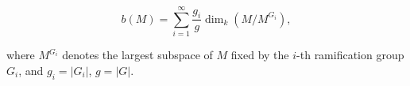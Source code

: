 $$b(M) = \sum_{i=1}^{\infty} \frac{g_i}{g} \dim_k(M/M^{G_i}),$$

where $M^{G_i}$ denotes the largest subspace of $M$ fixed by the $i$-th ramification group $G_i$, and $g_i = |G_i|$, $g = |G|$.

